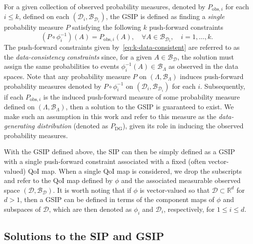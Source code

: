 \documentclass{article}
\newcommand{\B}{\mathcal{B}}
\newcommand{\pspace}{\Lambda}
\newcommand{\dspace}{\mathcal{D}}
\newcommand{\dborel}{\mathcal{B}_{\dspace}}
\begin{document}
For a given collection of observed probability measures, denoted by $P_{\text{obs},i}$ for each $i\le k$, defined on each $(\mathcal{D}_i, \B_{\mathcal{D}_i})$, the GSIP is defined as finding a \emph{single} probability measure $P$ satisfying the following $k$ push-forward constraints
\begin{equation}\label{eq:k-data-consistent}
    (P\circ \phi_{i}^{-1})(A) = P_{\text{obs},i}(A), \quad \forall A\in\B_{\mathcal{D}_i}, \quad i =1, \ldots, k.
\end{equation}
The push-forward constraints given by~\eqref{eq:k-data-consistent} are referred to as the {\em data-consistency constraints} since, for a given $A\in\dborel$, the solution must assign the same probabilities to events $\phi_i^{-1}(A)\in\B_{\pspace}$ as observed in the data spaces.
Note that any probability measure $P$ on $(\Lambda, \B_\Lambda)$ induces push-forward probability measures denoted by $P\circ \phi_{i}^{-1}$ on $(\mathcal{D}_i, \B_{\mathcal{D}_i})$ for each $i$.
Subsequently, if each $P_{\text{obs},i}$ is the induced push-forward measure of some probability measure defined on $(\Lambda, \B_\Lambda)$, then a solution to the GSIP is guaranteed to exist.
We make such an assumption in this work and refer to this measure as the {\em data-generating distribution} (denoted as $P_\text{DG}$), given its role in inducing the observed probability measures.

With the GSIP defined above, the SIP can then be simply defined as a GSIP with a single push-forward constraint associated with a fixed (often vector-valued) QoI map.
When a single QoI map is considered, we drop the subscripts and refer to the QoI map defined by $\phi$ and the associated measurable observed space $(\mathcal{D},\mathcal{B}_\mathcal{D})$.
It is worth noting that if $\phi$ is vector-valued so that $\mathcal{D}\subset\mathbb{R}^d$ for $d>1$, then a GSIP can be defined in terms of the component maps of $\phi$ and subspaces of $\mathcal{D}$, which are then denoted as $\phi_i$ and $\mathcal{D}_i$, respectively, for $1\leq i\leq d$.

\subsection{Solutions to the SIP and GSIP}
\end{document}
